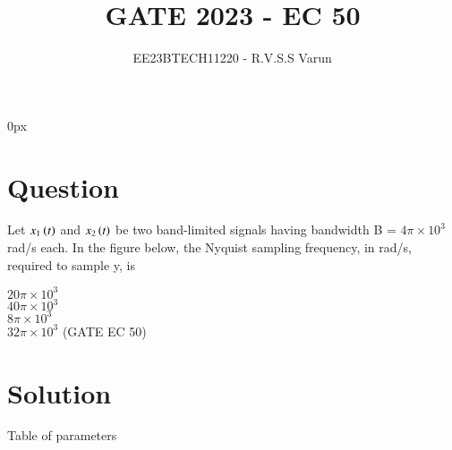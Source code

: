 \documentclass[beamer]{IEEEtran}
\theoremstyle{remark}
\begin{document}
\parindent 0px


\title{GATE 2023 - EC 50}
\author{EE23BTECH11220 - R.V.S.S Varun$^{}$%
}
\maketitle
\newpage
\bigskip

\renewcommand{\thefigure}{\theenumi}
\renewcommand{\thetable}{\theenumi}
\section*{Question}

Let $x_1\brak{t}$ and $x_2\brak{t}$ be two band-limited signals having bandwidth B = $4\pi\times10^3$
rad/s each. In the figure below, the Nyquist sampling frequency, in
rad/s, required to sample y, is
  \\
  \vspace{25pt}
\begin{figure}[ht]
    \centering
	\begin{circuitikz}
    
	\end{circuitikz}
    \label{fig:EC50.1}
\end{figure} 

     $20\pi\times10^3$\\
     $40\pi\times10^3$\\
     $8\pi\times10^3$\\
     $32\pi\times10^3$   \hfill(GATE EC 50)\\




\section*{Solution}


\begin{table}[ht]
    \centering
     
    \caption{Table of parameters}
    \label{tab:EC50.1}
\end{table}


\begin{figure}[ht]
    \centering
	
    
	
    \label{fig:EC50.2}
\end{figure} 


\begin{figure}[ht]
    \centering
	
    
	
    \label{fig:EC50.3}
\end{figure} 
\end{document}
